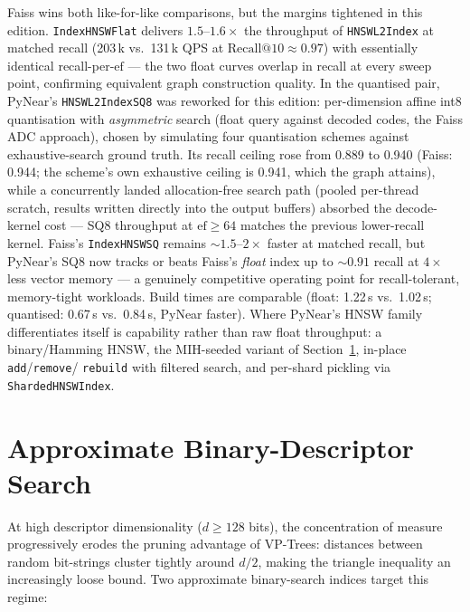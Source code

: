 \documentclass[11pt,a4paper]{article}
\begin{document}
Faiss wins both like-for-like comparisons, but the margins tightened in
this edition.  \texttt{IndexHNSWFlat} delivers $1.5$--$1.6\times$ the
throughput of \texttt{HNSWL2Index} at matched recall (203\,k vs.\
131\,k QPS at $\mathrm{Recall}@10 \approx 0.97$) with essentially
identical recall-per-$\mathrm{ef}$ — the two float curves overlap in
recall at every sweep point, confirming equivalent graph construction
quality.  In the quantised pair, PyNear's \texttt{HNSWL2IndexSQ8} was
reworked for this edition: per-dimension affine int8 quantisation with
\emph{asymmetric} search (float query against decoded codes, the Faiss
ADC approach), chosen by simulating four quantisation schemes against
exhaustive-search ground truth.  Its recall ceiling rose from 0.889 to
0.940 (Faiss: 0.944; the scheme's own exhaustive ceiling is 0.941, which
the graph attains), while a concurrently landed allocation-free search
path (pooled per-thread scratch, results written directly into the
output buffers) absorbed the decode-kernel cost — SQ8 throughput at
$\mathrm{ef} \ge 64$ matches the previous lower-recall kernel.  Faiss's
\texttt{IndexHNSWSQ} remains ${\sim}1.5$--$2\times$ faster at matched
recall, but PyNear's SQ8 now tracks or beats Faiss's \emph{float} index
up to ${\sim}0.91$ recall at $4\times$ less vector memory — a genuinely
competitive operating point for recall-tolerant, memory-tight
workloads.  Build times are comparable (float: 1.22\,s vs.\ 1.02\,s;
quantised: 0.67\,s vs.\ 0.84\,s, PyNear faster).  Where PyNear's HNSW
family differentiates itself is capability rather than raw float
throughput: a binary/Hamming HNSW, the MIH-seeded variant of
Section~\ref{sec:approx-binary}, in-place \texttt{add}/\texttt{remove}/%
\texttt{rebuild} with filtered search, and per-shard pickling via
\texttt{ShardedHNSWIndex}.

\section{Approximate Binary-Descriptor Search}
\label{sec:approx-binary}

At high descriptor dimensionality ($d \ge 128$ bits), the concentration of
measure progressively erodes the pruning advantage of VP-Trees: distances
between random bit-strings cluster tightly around $d/2$, making the triangle
inequality an increasingly loose bound.  Two
approximate binary-search indices target this regime:
\end{document}
